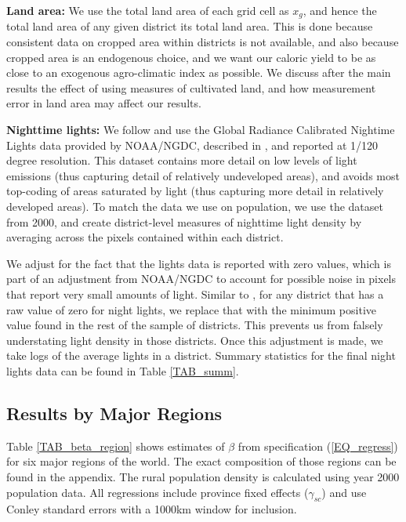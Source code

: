 \documentclass[11pt]{article}
\begin{document}
\vspace{.5cm}\noindent\textbf{Land area:} We use the total land area of each grid cell as $x_g$, and hence the total land area of any given district its total land area. This is done because consistent data on cropped area within districts is not available, and also because cropped area is an endogenous choice, and we want our caloric yield to be as close to an exogenous agro-climatic index as possible. We discuss after the main results the effect of using measures of cultivated land, and how measurement error in land area may affect our results.

\vspace{.5cm}\noindent\textbf{Nighttime lights:} We follow \citet{hssw2016} and use the Global Radiance Calibrated Nightime Lights data provided by NOAA/NGDC, described in \citet{Elvidge1999}, and reported at 1/120 degree resolution. This dataset contains more detail on low levels of light emissions (thus capturing detail of relatively undeveloped areas), and avoids most top-coding of areas saturated by light (thus capturing more detail in relatively developed areas). To match the data we use on population, we use the dataset from 2000, and create district-level measures of nighttime light density by averaging across the pixels contained within each district.

We adjust for the fact that the lights data is reported with zero values, which is part of an adjustment from NOAA/NGDC to account for possible noise in pixels that report very small amounts of light. Similar to \citet{hssw2016}, for any district that has a raw value of zero for night lights, we replace that with the minimum positive value found in the rest of the sample of districts. This prevents us from falsely understating light density in those districts. Once this adjustment is made, we take logs of the average lights in a district. Summary statistics for the final night lights data can be found in Table \ref{TAB_summ}.

\subsection{Results by Major Regions} 
Table \ref{TAB_beta_region} shows estimates of $\beta$ from specification (\ref{EQ_regress}) for six major regions of the world. The exact composition of those regions can be found in the appendix. The rural population density is calculated using year 2000 population data. All regressions include province fixed effects ($\gamma_{sc}$) and use Conley standard errors with a 1000km window for inclusion.
\end{document}
